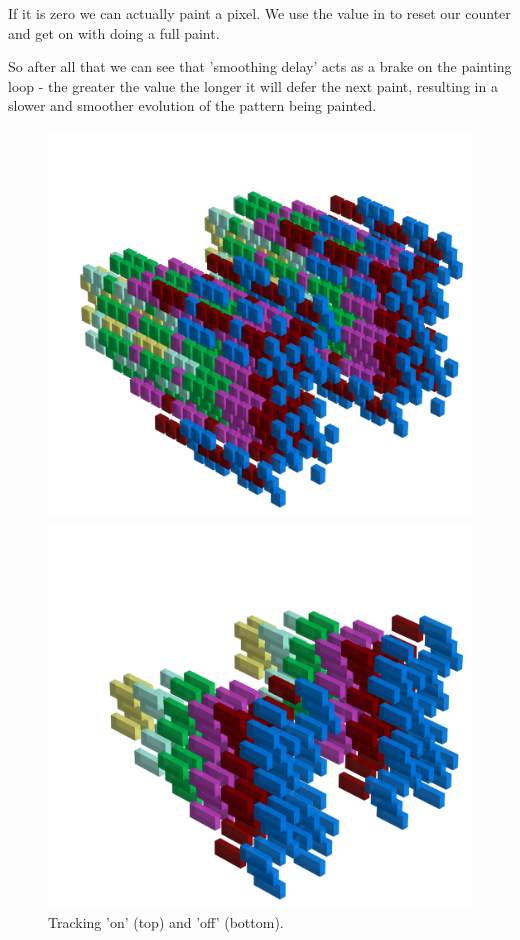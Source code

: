 If it is zero we can actually paint a pixel. We use the value in 
to reset our counter and get on with doing a full paint.

So after all that we can see that 'smoothing delay' acts as a brake on the painting loop - the greater
the value the longer it will defer the next paint, resulting in a slower and smoother evolution of the
pattern being painted.

\begin{figure}[H]
    \centering
    \begin{adjustbox}{width=10.5cm,center}
      \includegraphics[width=12cm]{src/tracking/pattern1-0-45.png}%
    \end{adjustbox}
    \begin{adjustbox}{width=10.5cm,margin=0cm -2cm}
      \includegraphics[width=12cm]{src/tracking/pattern1-1-45.png}%
    \end{adjustbox}
    \caption{Tracking 'on' (top) and 'off' (bottom).}
\end{figure}
\clearpage

